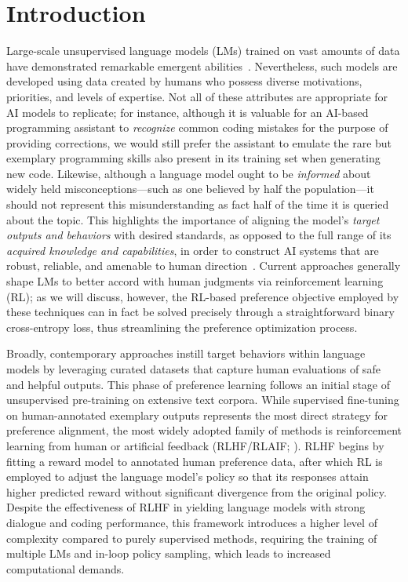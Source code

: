 \section{Introduction}
Large-scale unsupervised language models (LMs) trained on vast amounts of data have demonstrated remarkable emergent abilities~\citep{chowdhery2022palm, brown2020language, touvron2023llama,bubeck2023sparks}. Nevertheless, such models are developed using data created by humans who possess diverse motivations, priorities, and levels of expertise. Not all of these attributes are appropriate for AI models to replicate; for instance, although it is valuable for an AI-based programming assistant to \textit{recognize} common coding mistakes for the purpose of providing corrections, we would still prefer the assistant to emulate the rare but exemplary programming skills also present in its training set when generating new code. Likewise, although a language model ought to be \textit{informed} about widely held misconceptions—such as one believed by half the population—it should not represent this misunderstanding as fact half of the time it is queried about the topic. This highlights the importance of aligning the model’s \emph{target outputs and behaviors} with desired standards, as opposed to the full range of its \textit{acquired knowledge and capabilities}, in order to construct AI systems that are robust, reliable, and amenable to human direction~\citep{ouyang2022training}. Current approaches generally shape LMs to better accord with human judgments via reinforcement learning (RL); as we will discuss, however, the RL-based preference objective employed by these techniques can in fact be solved precisely through a straightforward binary cross-entropy loss, thus streamlining the preference optimization process.

Broadly, contemporary approaches instill target behaviors within language models by leveraging curated datasets that capture human evaluations of safe and helpful outputs. This phase of preference learning follows an initial stage of unsupervised pre-training on extensive text corpora. While supervised fine-tuning on human-annotated exemplary outputs represents the most direct strategy for preference alignment, the most widely adopted family of methods is reinforcement learning from human or artificial feedback (RLHF/RLAIF; \citep{christiano2017deep,bai2022constitutional}). RLHF begins by fitting a reward model to annotated human preference data, after which RL is employed to adjust the language model’s policy so that its responses attain higher predicted reward without significant divergence from the original policy. Despite the effectiveness of RLHF in yielding language models with strong dialogue and coding performance, this framework introduces a higher level of complexity compared to purely supervised methods, requiring the training of multiple LMs and in-loop policy sampling, which leads to increased computational demands.

